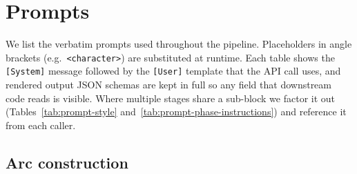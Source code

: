 \documentclass{llmxive}
\begin{document}

\section{Prompts\label{app:prompts}}

We list the verbatim prompts used throughout the pipeline. Placeholders in angle brackets (e.g.\ \texttt{<character>}) are substituted at runtime. Each table shows the \texttt{[System]} message followed by the \texttt{[User]} template that the API call uses, and rendered output JSON schemas are kept in full so any field that downstream code reads is visible. Where multiple stages share a sub-block we factor it out (Tables~\ref{tab:prompt-style} and~\ref{tab:prompt-phase-instructions}) and reference it from each caller.


\subsection{Arc construction}
\end{document}

